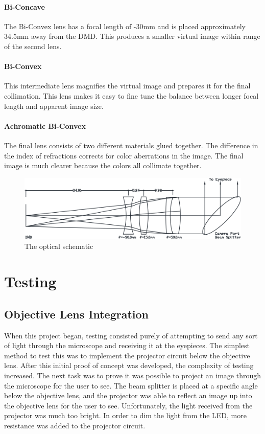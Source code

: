 \documentclass[12pt,a4paper]{article}
\begin{document}
\paragraph{Bi-Concave}
	The Bi-Convex lens has a focal length of -30mm and is placed approximately 34.5mm away from the DMD. This produces a smaller virtual image within range of the second lens.
\paragraph{Bi-Convex}
This intermediate lens magnifies the virtual image and prepares it for the final collimation. This lens makes it easy to fine tune the balance between longer focal length and apparent image size.
\paragraph{Achromatic Bi-Convex}
The final lens consists of two different materials glued together. The difference in the index of refractions corrects for color aberrations in the image. The final image is much clearer because the colors all collimate together.

\begin{figure}[h!]
	\centering	
	\includegraphics[width = \textwidth]{pics/LENSdRAWING.png}
	\caption[Optics Diagram]{The optical schematic}
\end{figure}

\section{Testing}
\subsection{Objective Lens Integration}
When this project began, testing consisted purely of attempting to send any sort of light through the microscope and receiving it at the eyepieces. The simplest method to test this was to implement the projector circuit below the objective lens. After this initial proof of concept was developed, the complexity of testing increased. The next task was to prove it was possible to project an image through the microscope for the user to see. The beam splitter is placed at a specific angle below the objective lens, and the projector was able to reflect an image up into the objective lens for the user to see. Unfortunately, the light received from the projector was much too bright. In order to dim the light from the LED, more resistance was added to the projector circuit.
\end{document}
